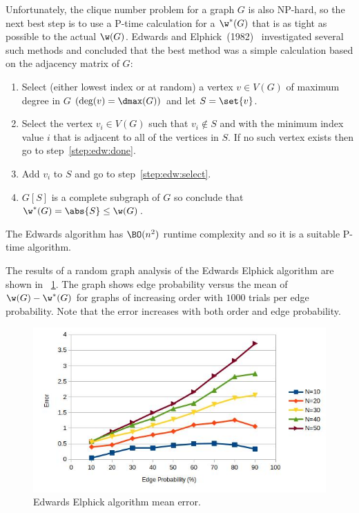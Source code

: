 Unfortunately, the clique number problem for a graph \(G\) is also NP-hard, so the next best step is to use a
P-time calculation for a \(\w^*(G)\) that is as tight as possible to the actual \(\w(G)\).  Edwards and
Elphick~(1982)~\cite{edwards} investigated several such methods and concluded that the best method was a simple
calculation based on the adjacency matrix of \(G\):
\begin{enumerate}
\item Select (either lowest index or at random) a vertex \(v\in V(G)\) of maximum degree in \(G\)
  \((\deg(v)=\dmax(G))\) and let \(S=\set{v}\).
\item\label{step:edw:select} Select the vertex \(v_i\in V(G)\) such that \(v_i\notin S\) and with the minimum index
  value \(i\) that is adjacent to all of the vertices in \(S\).  If no such vertex exists then go to
  step~\ref{step:edw:done}.
\item Add \(v_i\) to \(S\) and go to step~\ref{step:edw:select}.
\item\label{step:edw:done} \(G[S]\) is a complete subgraph of \(G\) so conclude that \(\w^*(G)=\abs{S}\le\w(G)\).
\end{enumerate}

The Edwards algorithm has \(\BO(n^2)\) runtime complexity and so it is a suitable P-time algorithm.

The results of a random graph analysis of the Edwards Elphick algorithm are shown in
\figurename~\ref{fig:edwards1err}.  The graph shows edge probability versus the mean of \(\w(G)-\w^*(G)\) for
graphs of increasing order with \(1000\) trials per edge probability.  Note that the error increases with both
order and edge probability.

\begin{figure}[H]
  \centering
  \includegraphics[width=5in]{edwards1_error}
  \caption{Edwards Elphick algorithm mean error.}
  \label{fig:edwards1err}
\end{figure}

